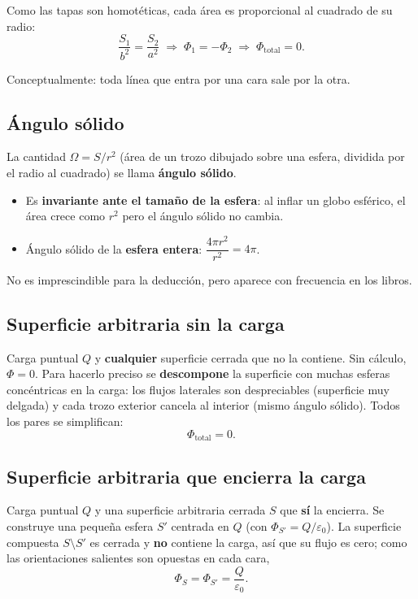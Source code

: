 \documentclass[12pt,a4paper]{article}
\begin{document}
Como las tapas son homotéticas, cada área es proporcional al cuadrado
de su radio:
\[
\frac{S_1}{b^{2}} = \frac{S_2}{a^{2}}
\;\Longrightarrow\; \Phi_1 = -\Phi_2
\;\Longrightarrow\; \Phi_{\text{total}} = 0 .
\]

Conceptualmente: toda línea que entra por una cara sale por la otra.

\subsection{Ángulo sólido}

La cantidad $\Omega = S/r^{2}$ (área de un trozo dibujado sobre una
esfera, dividida por el radio al cuadrado) se llama \textbf{ángulo
sólido}.

\begin{itemize}[nosep]
  \item Es \textbf{invariante ante el tamaño de la esfera}: al inflar
        un globo esférico, el área crece como $r^{2}$ pero el ángulo
        sólido no cambia.
  \item Ángulo sólido de la \textbf{esfera entera}:
        $\dfrac{4\pi r^{2}}{r^{2}} = 4\pi$.
\end{itemize}

\begin{notebox}
  No es imprescindible para la deducción, pero aparece con frecuencia
  en los libros.
\end{notebox}

\subsection{Superficie arbitraria sin la carga}

Carga puntual $Q$ y \textbf{cualquier} superficie cerrada que no la
contiene. Sin cálculo, $\Phi = 0$. Para hacerlo preciso se
\textbf{descompone} la superficie con muchas esferas concéntricas en la
carga: los flujos laterales son despreciables (superficie muy delgada)
y cada trozo exterior cancela al interior (mismo ángulo sólido). Todos
los pares se simplifican:
\[
\Phi_{\text{total}} = 0 .
\]

\subsection{Superficie arbitraria que encierra la carga}

Carga puntual $Q$ y una superficie arbitraria cerrada $S$ que
\textbf{sí} la encierra. Se construye una pequeña esfera $S'$ centrada
en $Q$ (con $\Phi_{S'} = Q/\varepsilon_0$). La superficie compuesta
$S \setminus S'$ es cerrada y \textbf{no} contiene la carga, así que su
flujo es cero; como las orientaciones salientes son opuestas en cada
cara,
\[
\boxed{\Phi_S = \Phi_{S'} = \frac{Q}{\varepsilon_0}} .
\]
\end{document}
